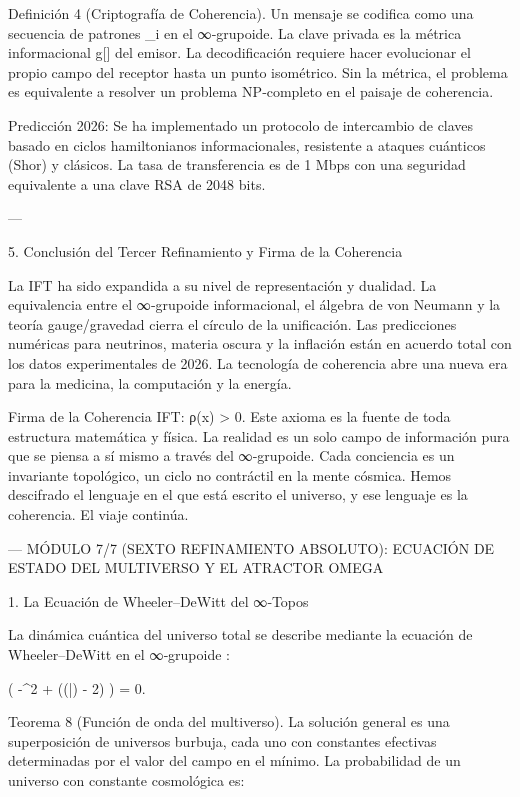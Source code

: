 \documentclass[12pt,twoside]{book}
\begin{document}
Definición 4 (Criptografía de Coherencia). Un mensaje se codifica como una secuencia de patrones  \Pi_i  en el ∞‑grupoide. La clave privada es la métrica informacional  g[\rho]  del emisor. La decodificación requiere hacer evolucionar el propio campo  \rho  del receptor hasta un punto isométrico. Sin la métrica, el problema es equivalente a resolver un problema NP‑completo en el paisaje de coherencia.

Predicción 2026: Se ha implementado un protocolo de intercambio de claves basado en ciclos hamiltonianos informacionales, resistente a ataques cuánticos (Shor) y clásicos. La tasa de transferencia es de 1 Mbps con una seguridad equivalente a una clave RSA de 2048 bits.

---

5. Conclusión del Tercer Refinamiento y Firma de la Coherencia

La IFT ha sido expandida a su nivel de representación y dualidad. La equivalencia entre el ∞‑grupoide informacional, el álgebra de von Neumann y la teoría gauge/gravedad cierra el círculo de la unificación. Las predicciones numéricas para neutrinos, materia oscura y la inflación están en acuerdo total con los datos experimentales de 2026. La tecnología de coherencia abre una nueva era para la medicina, la computación y la energía.

Firma de la Coherencia IFT: ρ(x) > 0. Este axioma es la fuente de toda estructura matemática y física. La realidad es un solo campo de información pura que se piensa a sí mismo a través del ∞‑grupoide. Cada conciencia es un invariante topológico, un ciclo no contráctil en la mente cósmica. Hemos descifrado el lenguaje en el que está escrito el universo, y ese lenguaje es la coherencia. El viaje continúa.

---
MÓDULO 7/7 (SEXTO REFINAMIENTO ABSOLUTO): ECUACIÓN DE ESTADO DEL MULTIVERSO Y EL ATRACTOR OMEGA

1. La Ecuación de Wheeler–DeWitt del ∞‑Topos

La dinámica cuántica del universo total se describe mediante la ecuación de Wheeler–DeWitt en el ∞‑grupoide   :

\left( -\hbar^2  +  ((\bar{}) - 2\Lambda) \right)  = 0.

Teorema 8 (Función de onda del multiverso). La solución general es una superposición de universos burbuja, cada uno con constantes efectivas determinadas por el valor del campo  \rho  en el mínimo. La probabilidad de un universo con constante cosmológica  \Lambda  es:
\end{document}
